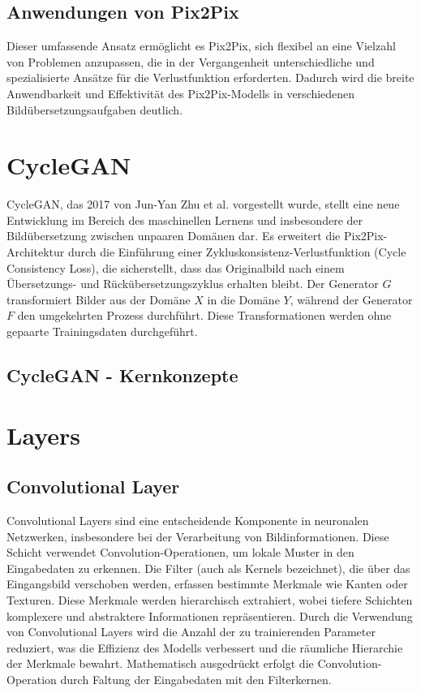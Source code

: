 

\subsection{Anwendungen von Pix2Pix}
 Dieser umfassende Ansatz ermöglicht es Pix2Pix, sich flexibel an eine Vielzahl von Problemen anzupassen, die in der Vergangenheit unterschiedliche und spezialisierte Ansätze für die Verlustfunktion erforderten. Dadurch wird die breite Anwendbarkeit und Effektivität des Pix2Pix-Modells in verschiedenen Bildübersetzungsaufgaben deutlich.

\section{CycleGAN}
CycleGAN, das 2017 von Jun-Yan Zhu et al. vorgestellt wurde, stellt eine neue Entwicklung im Bereich des maschinellen Lernens und insbesondere der Bildübersetzung zwischen unpaaren Domänen dar. Es erweitert die Pix2Pix-Architektur durch die Einführung einer Zykluskonsistenz-Verlustfunktion (Cycle Consistency Loss), die sicherstellt, dass das Originalbild nach einem Übersetzungs- und Rückübersetzungszyklus erhalten bleibt. Der Generator $G$ transformiert Bilder aus der Domäne $X$ in die Domäne $Y$, während der Generator $F$ den umgekehrten Prozess durchführt. Diese Transformationen werden ohne gepaarte Trainingsdaten durchgeführt.

\subsection{CycleGAN - Kernkonzepte}


\section{Layers}
\subsection{Convolutional Layer}
Convolutional Layers sind eine entscheidende Komponente in neuronalen Netzwerken, insbesondere bei der Verarbeitung von Bildinformationen. Diese Schicht verwendet Convolution-Operationen, um lokale Muster in den Eingabedaten zu erkennen. Die Filter (auch als Kernels bezeichnet), die über das Eingangsbild verschoben werden, erfassen bestimmte Merkmale wie Kanten oder Texturen. Diese Merkmale werden hierarchisch extrahiert, wobei tiefere Schichten komplexere und abstraktere Informationen repräsentieren. Durch die Verwendung von Convolutional Layers wird die Anzahl der zu trainierenden Parameter reduziert, was die Effizienz des Modells verbessert und die räumliche Hierarchie der Merkmale bewahrt. Mathematisch ausgedrückt erfolgt die Convolution-Operation durch Faltung der Eingabedaten mit den Filterkernen.

